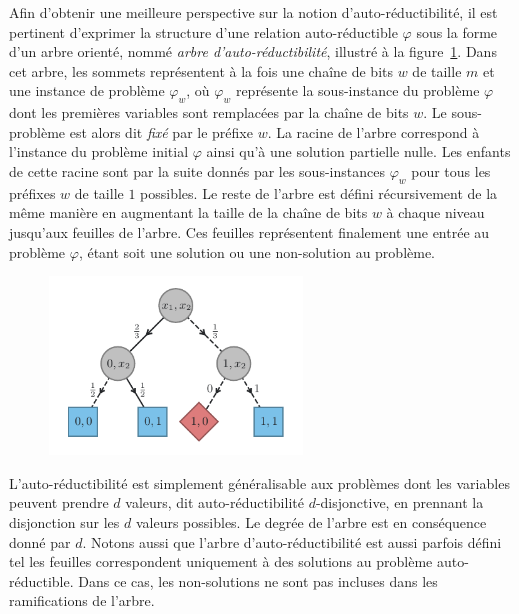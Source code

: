 Afin d'obtenir une meilleure perspective sur la notion d'auto-réductibilité, il est pertinent d'exprimer la structure d'une relation auto-réductible $\varphi$ sous la forme d'un arbre orienté, nommé \textit{arbre d'auto-réductibilité}, illustré à la figure~\ref{fig:arbre-auto-reductibilite}. Dans cet arbre, les sommets représentent à la fois une chaîne de bits $w$ de taille $m$ et une instance de problème $\varphi_{w}$, où $\varphi_{w}$ représente la sous-instance du problème $\varphi$ dont les premières variables sont remplacées par la chaîne de bits $w$. Le sous-problème est alors dit \textit{fixé} par le préfixe $w$. La racine de l'arbre correspond à l'instance du problème initial $\varphi$ ainsi qu'à une solution partielle nulle. Les enfants de cette racine sont par la suite donnés par les sous-instances $\varphi_{w}$ pour tous les préfixes $w$ de taille $1$ possibles. Le reste de l'arbre est défini récursivement de la même manière en augmentant la taille de la chaîne de bits $w$ à chaque niveau jusqu'aux feuilles de l'arbre. Ces feuilles représentent finalement une entrée au problème $\varphi$, étant soit une solution ou une non-solution au problème.

\begin{figure}[ht!]
    \centering
    \includegraphics[width=0.6\textwidth]{figures/jvv-algorithm.pdf}
    \caption[Arbre d'auto-réductibilité]{}
    \label{fig:arbre-auto-reductibilite}
\end{figure}

L'auto-réductibilité est simplement généralisable aux problèmes dont les variables peuvent prendre $d$ valeurs, dit auto-réductibilité $d$-disjonctive, en prennant la disjonction sur les $d$ valeurs possibles. Le degrée de l'arbre est en conséquence donné par $d$. Notons aussi que l'arbre d'auto-réductibilité est aussi parfois défini tel les feuilles correspondent uniquement à des solutions au problème auto-réductible. Dans ce cas, les non-solutions ne sont pas incluses dans les ramifications de l'arbre.

